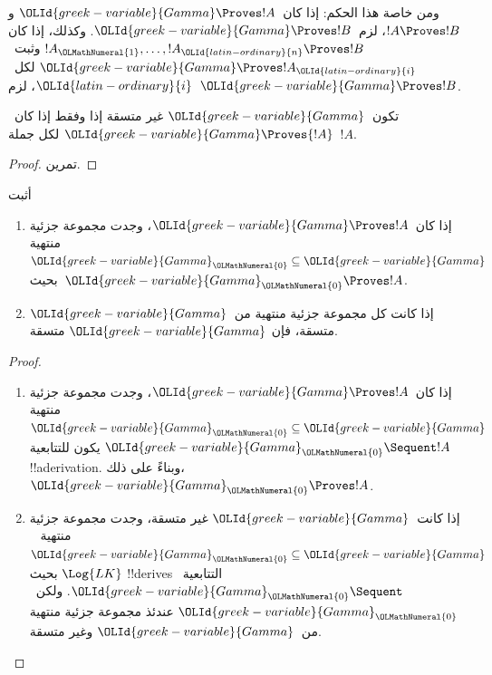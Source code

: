 \documentclass[../../../include/open-logic-section]{subfiles}
\begin{document}
ومن خاصة هذا الحكم: إذا كان~$\OLId{greek-variable}{Gamma} \Proves !A$ و
$!A \Proves !B$، لزم~$\OLId{greek-variable}{Gamma} \Proves !B$.
وكذلك، إذا كان $!A_\OLMathNumeral{1}, \dots, !A_\OLId{latin-ordinary}{n} \Proves !B$ وثبت~$\OLId{greek-variable}{Gamma} \Proves !A_\OLId{latin-ordinary}{i}$ لكل~$\OLId{latin-ordinary}{i}$،
لزم~$\OLId{greek-variable}{Gamma} \Proves !B$.

\begin{prop}
تكون~$\OLId{greek-variable}{Gamma}$ غير متسقة إذا وفقط إذا كان~$\OLId{greek-variable}{Gamma} \Proves {!A}$ لكل
  جملة~$!A$.
\end{prop}

\begin{proof}
تمرين.
\end{proof}

\begin{prob}
أثبت 
\end{prob}

\begin{prop}[التراص]
  \begin{enumerate}
  \item إذا كان~$\OLId{greek-variable}{Gamma} \Proves !A$، وجدت مجموعة جزئية منتهية
    $\OLId{greek-variable}{Gamma}_\OLMathNumeral{0} \subseteq \OLId{greek-variable}{Gamma}$ بحيث~$\OLId{greek-variable}{Gamma}_\OLMathNumeral{0} \Proves !A$.
  \item إذا كانت كل مجموعة جزئية منتهية من~$\OLId{greek-variable}{Gamma}$ متسقة، فإن
    $\OLId{greek-variable}{Gamma}$ متسقة.
  \end{enumerate}
\end{prop}

\begin{proof}
  \begin{enumerate}
    \item إذا كان~$\OLId{greek-variable}{Gamma} \Proves !A$، وجدت مجموعة جزئية منتهية
      $\OLId{greek-variable}{Gamma}_\OLMathNumeral{0} \subseteq \OLId{greek-variable}{Gamma}$ يكون للتتابعية
      $\OLId{greek-variable}{Gamma}_\OLMathNumeral{0} \Sequent !A$ !!a{derivation}. وبناءً على ذلك،
      $\OLId{greek-variable}{Gamma}_\OLMathNumeral{0} \Proves !A$.
    \item إذا كانت~$\OLId{greek-variable}{Gamma}$ غير متسقة، وجدت مجموعة جزئية منتهية
      ~$\OLId{greek-variable}{Gamma}_\OLMathNumeral{0} \subseteq \OLId{greek-variable}{Gamma}$ بحيث $\Log{LK}$ !!{derive}s
      التتابعية~$\OLId{greek-variable}{Gamma}_\OLMathNumeral{0} \Sequent \quad$. ولكن~$\OLId{greek-variable}{Gamma}_\OLMathNumeral{0}$ عندئذ
      مجموعة جزئية منتهية من~$\OLId{greek-variable}{Gamma}$ وغير متسقة.
  \end{enumerate}
\end{proof}
\end{document}
